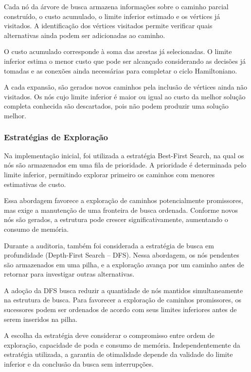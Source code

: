 \documentclass[12pt]{article}
\begin{document}
Cada nó da árvore de busca armazena informações sobre o caminho
parcial construído, o custo acumulado, o limite inferior estimado
e os vértices já visitados. A identificação dos vértices visitados
permite verificar quais alternativas ainda podem ser adicionadas
ao caminho.

O custo acumulado corresponde à soma das arestas já selecionadas.
O limite inferior estima o menor custo que pode ser alcançado
considerando as decisões já tomadas e as conexões ainda necessárias
para completar o ciclo Hamiltoniano.

A cada expansão, são gerados novos caminhos pela inclusão de
vértices ainda não visitados. Os nós cujo limite inferior é maior
ou igual ao custo da melhor solução completa conhecida são
descartados, pois não podem produzir uma solução melhor.



\subsubsection{Estratégias de Exploração}

Na implementação inicial, foi utilizada a estratégia Best-First
Search, na qual os nós são armazenados em uma fila de prioridade.
A prioridade é determinada pelo limite inferior, permitindo
explorar primeiro os caminhos com menores estimativas de custo.

Essa abordagem favorece a exploração de caminhos potencialmente
promissores, mas exige a manutenção de uma fronteira de busca
ordenada. Conforme novos nós são gerados, a estrutura pode crescer
significativamente, aumentando o consumo de memória.

Durante a auditoria, também foi considerada a estratégia de busca
em profundidade (Depth-First Search -- DFS). Nessa abordagem,
os nós pendentes são armazenados em uma pilha, e a exploração
avança por um caminho antes de retornar para investigar outras
alternativas.

A adoção da DFS busca reduzir a quantidade de nós mantidos
simultaneamente na estrutura de busca. Para favorecer a exploração
de caminhos promissores, os sucessores podem ser ordenados de
acordo com seus limites inferiores antes de serem inseridos na
pilha.

A escolha da estratégia deve considerar o compromisso entre
ordem de exploração, capacidade de poda e consumo de memória.
Independentemente da estratégia utilizada, a garantia de
otimalidade depende da validade do limite inferior e da conclusão
da busca sem interrupções.
\end{document}
